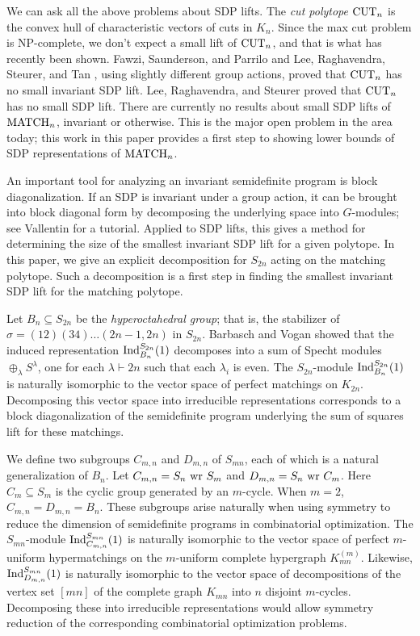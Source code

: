 \documentclass[12pt]{amsart}
\numberwithin{theorem}{section}
\newcommand{\Ind}{\textup{Ind}}
\newcommand{\wreath}{\textup{ wr }}
\newcommand{\MATCH}{\textup{MATCH}}
\newcommand{\CUT}{\textup{CUT}}
\begin{document}
We can ask all the above problems about SDP lifts.
The {\em cut polytope} $\CUT_n$ is the convex hull of characteristic vectors of cuts in $K_{n}$.
Since the max cut problem is NP-complete, we don't expect a small lift of $\CUT_n$, and that is what has recently been shown.
Fawzi, Saunderson, and Parrilo \cite{fawzi2014equivariant} and Lee, Raghavendra, Steurer, and Tan \cite{lee2014power}, using slightly different group actions, proved that $\CUT_n$ has no small invariant SDP lift.
Lee, Raghavendra, and Steurer \cite{lee2014lower} proved that $\CUT_n$ has no small SDP lift.
There are currently no results about small SDP lifts of $\MATCH_n$, invariant or otherwise.
This is the major open problem in the area today; this work in this paper provides a first step to showing lower bounds of SDP representations of $\MATCH_n$.

An important tool for analyzing an invariant semidefinite program is block diagonalization.
If an SDP is invariant under a group action, it can be brought into block diagonal form by decomposing the underlying space into $G$-modules; see Vallentin \cite{vallentin2009symmetry} for a tutorial.
Applied to SDP lifts, this gives a method for determining the size of the smallest invariant SDP lift for a given polytope.
In this paper, we give an explicit decomposition for $S_{2n}$ acting on the matching polytope.
Such a decomposition is a first step in finding the smallest invariant SDP lift for the matching polytope.



Let $B_n \subseteq S_{2n}$ be the {\em hyperoctahedral group}; that is, the stabilizer of $\sigma = (12)(34)\ldots (2n-1,2n)$ in $S_{2n}$.
Barbasch and Vogan \cite{bv} showed that the induced representation $\Ind_{B_n}^{S_{2n}}(1)$ decomposes into a sum of Specht modules $\oplus_\lambda S^\lambda$, one for each $\lambda \vdash 2n$ such that each $\lambda_i$ is even.
The $S_{2n}$-module $\Ind_{B_n}^{S_{2n}}(1)$ is naturally isomorphic to the vector space of perfect matchings on $K_{2n}$.
Decomposing this vector space into irreducible representations corresponds to a block diagonalization of the semidefinite program underlying the sum of squares lift for these matchings.

We define two subgroups $C_{m,n}$ and $D_{m,n}$ of $S_{mn}$, each of which is a natural generalization of $B_n$.
Let $C_{m,n} = S_n \wreath S_m$ and $D_{m,n} = S_n \wreath C_m$.
Here $C_m \subseteq S_m$ is the cyclic group generated by an $m$-cycle.
When $m=2$, $C_{m,n} = D_{m,n} = B_n$.
These subgroups arise naturally when using symmetry to reduce the dimension of semidefinite programs in combinatorial optimization.
The $S_{mn}$-module $\Ind_{C_{m,n}}^{S_{mn}}(1)$ is naturally isomorphic to the vector space of perfect $m$-uniform hypermatchings on the $m$-uniform complete hypergraph $K^{(m)}_{mn}$.
Likewise, $\Ind_{D_{m,n}}^{S_{mn}}(1)$ is naturally isomorphic to the vector space of decompositions of the vertex set $[mn]$ of the complete graph $K_{mn}$ into $n$ disjoint $m$-cycles.
Decomposing these into irreducible representations would allow symmetry reduction of the corresponding combinatorial optimization problems.
\end{document}
